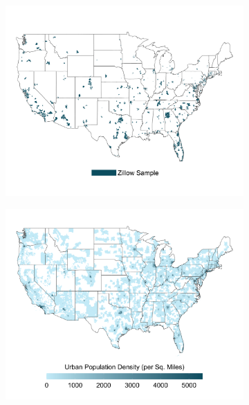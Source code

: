 \documentclass{article}
\begin{document}
\clearpage
\begin{figure}
	\caption{Comparison Between Zillow Sample and Population Density in CBSAs}
	\begin{subfigure}[b]{\textwidth}\centering
		\includegraphics[width = .9\textwidth]{../../analysis/descriptive_maps/output/sample_map.png}
	\end{subfigure}
	\quad 
	\begin{subfigure}[b]{\textwidth}\centering
		\includegraphics[width = .9\textwidth]{../../analysis/descriptive_maps/output/popurban_density_map.png}
	\end{subfigure}
\end{figure}
\end{document}

